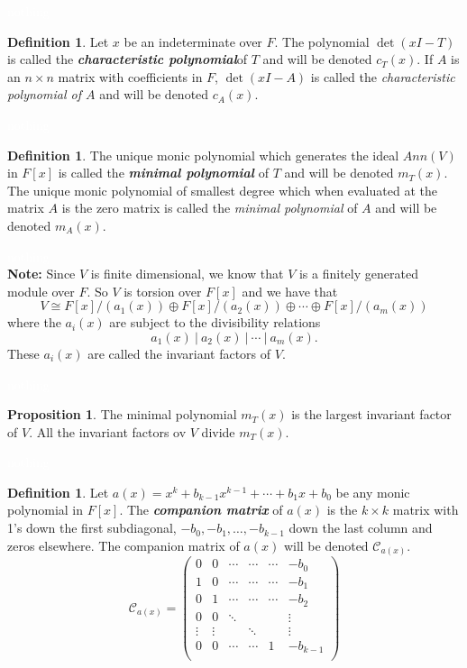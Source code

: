 \documentclass{article}
\theoremstyle{definition}
\newtheorem{prop}[thm]{Proposition}
\newtheorem{defn}[thm]{Definition}
\newcommand{\nl}{\textcolor{white}{nothing}}
\newcommand{\CC}{\mathcal{C}}
\begin{document}
\nl

\begin{defn}
Let $x$ be an indeterminate over $F$. The polynomial $\det(xI - T)$ is called the \textit{\textbf{characteristic polynomial}}of $T$ and will be denoted $c_T(x)$. If $A$ is an $n\times n$ matrix with coefficients in $F$, $\det(xI- A)$ is called the \textit{characteristic polynomial of $A$} and will be denoted $c_A(x)$.
\end{defn}

\nl

\begin{defn}
The unique monic polynomial which generates the ideal $Ann(V)$ in $F[x]$ is called the \textit{\textbf{minimal polynomial}} of $T$ and will be denoted $m_T(x)$. The unique monic polynomial of smallest degree which when evaluated at the matrix $A$ is the zero matrix is called the \textit{minimal polynomial} of $A$  and will be denoted $m_A(x)$.
\end{defn}
\nl\\
\textbf{Note:} Since $V$ is finite dimensional, we know that $V$ is a finitely generated module over $F$. So $V$ is torsion over $F[x]$ and we have that
\[V\cong F[x]/(a_1(x)) \oplus F[x]/(a_2(x))\oplus \cdots \oplus F[x]/(a_m(x))\]
where the $a_i(x)$ are subject to the divisibility relations
\[a_1(x)\ |\  a_2(x)\ |\ \cdots\ |\  a_m(x).\]
These $a_i(x)$ are called the invariant factors of $V$.

\nl

\begin{prop}
The minimal polynomial $m_T(x)$ is the largest invariant factor of $V$. All the invariant factors ov $V$ divide $m_T(x)$.
\end{prop}

\nl

\begin{defn}
Let $a(x) = x^k + b_{k - 1}x^{k - 1} + \cdots + b_1 x + b_0$ be any monic polynomial in $F[x]$. The \textit{\textbf{companion matrix}} of $a(x)$ is the $k\times k$ matrix with 1's down the first subdiagonal, $-b_0, -b_1, \ldots, -b_{k - 1}$ down the last column and zeros elsewhere. The companion matrix of $a(x)$ will be denoted $\CC_{a(x)}$.
\[\CC_{a(x)} = \begin{pmatrix}
0 & 0 & \cdots & \cdots & \cdots & -b_0\\
1 & 0 & \cdots & \cdots & \cdots & -b_1\\
0 & 1 & \cdots & \cdots & \cdots & -b_2\\
0 & 0 & \ddots &  &  & \vdots\\
\vdots & \vdots & & \ddots  &  & \vdots\\
0 & 0 & \cdots & \cdots & 1 & -b_{k - 1}\\
\end{pmatrix}\]
\end{defn}
\end{document}
